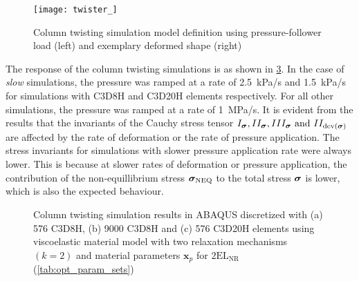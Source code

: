 \begin{figure}[htbp]
    \centering
    \texttt{[image: twister\_]} 
    \caption[Column twisting simulation]{Column twisting simulation model definition using pressure-follower load (left) and exemplary deformed shape (right)}%
    \label{fig:twister}
\end{figure}

The response of the column twisting simulations is as shown in \cref{fig:column_twisting}. In the case of \emph{slow} simulations, the pressure was ramped at a rate of 2.5~kPa/s and 1.5~kPa/s for simulations with C3D8H and C3D20H elements respectively. For all other simulations, the pressure was ramped at a rate of 1~MPa/s. It is evident from the results that the invariants of the Cauchy stress tensor \(I_{\bm{\sigma}}, II_{\bm{\sigma}}, III_{\bm{\sigma}} \text{ and } II_{\mathrm{dev}(\bm{\sigma})}\) are affected by the rate of deformation or  the rate of pressure application. The stress invariants for simulations with slower pressure application rate were always lower. This is because at slower rates of deformation or pressure application, the contribution of the non-equillibrium stress \(\bm{\sigma}_{\text{NEQ}}\) to the total stress \(\bm{\sigma}\) is lower, which is also the expected behaviour.

\begin{figure}[htpb]
    \centering
     \label{fig:twist8} 
     \label{fig:twistfine8}
\end{figure}
\begin{figure}[htpb]\ContinuedFloat
    \centering
     \label{fig:twist20}
    \caption[Column twisting simulation results]{Column twisting simulation results in ABAQUS discretized with (a) 576 C3D8H, (b) 9000 C3D8H and (c) 576 C3D20H elements using viscoelastic material model with two relaxation mechanisms \((k=2)\) and material parameters \(\bm{x}_{p}\) for \(2\mathrm{EL}_{\mathrm{NR}}\) (\cref{tab:opt_param_sets})}\label{fig:column_twisting}
\end{figure}




